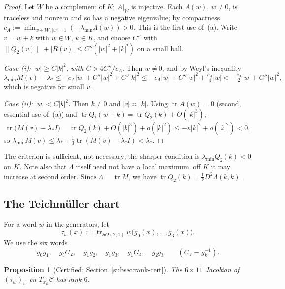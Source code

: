 \documentclass[11pt]{amsart}
\newtheorem{proposition}[theorem]{Proposition}
\theoremstyle{definition}
\theoremstyle{remark}
\newcommand{\Oct}{\mathcal{C}}
\newcommand{\tr}{\operatorname{tr}}
\newcommand{\ls}{\lambda_*}
\newcommand{\xB}{x_B}
\begin{document}
\begin{proof}
Let $W$ be a complement of $K$; $A|_W$ is injective. Each $A(w)$, $w\ne0$, is traceless and nonzero
and so has a negative eigenvalue; by compactness
$c_A:=\min_{w\in W,|w|=1}(-\lambda_{\min}A(w))>0$. This is the first use of~(a). Write $v=w+k$
with $w\in W$, $k\in K$, and choose $C''$ with $\|Q_2(v)\|+|R(v)|\le C''(|w|^2+|k|^2)$ on a small ball.

\emph{Case (i): $|w|\ge C|k|^2$, with $C>4C''/c_A$.} Then $w\ne0$, and by Weyl's inequality
\[
\lambda_{\min}M(v)-\ls\le-c_A|w|+C''|w|^2+C''|k|^2\le-c_A|w|+C''|w|^2+\tfrac{c_A}{4}|w|<-\tfrac{c_A}{2}|w|+C''|w|^2,
\]
which is negative for small $v$.

\emph{Case (ii): $|w|<C|k|^2$.} Then $k\ne0$ and $|v|\asymp|k|$. Using $\tr A(w)=0$ (second,
essential use of~(a)) and $\tr Q_2(w+k)=\tr Q_2(k)+O(|k|^3)$,
\[
\tr\big(M(v)-\ls I\big)=\tr Q_2(k)+O(|k|^3)+o(|k|^2)\le-\kappa|k|^2+o(|k|^2)<0,
\]
so $\lambda_{\min}M(v)\le\ls+\tfrac13\tr(M(v)-\ls I)<\ls$.
\end{proof}

The criterion is sufficient, not necessary; the sharper condition is
$\lambda_{\min}Q_2(k)<0$ on $K$. Note also that $\Lambda$ itself need not have a local maximum: off
$K$ it may increase at second order. Since $\Lambda=\tr M$, we have
$\tr Q_2(k)=\tfrac12D^2\Lambda(k,k)$.

\subsection{The Teichm\"uller chart}\label{subsec:chart}
For a word $w$ in the generators, let
\[
\tau_w(x):=\tr_{SO(2,1)}w\big(g_0(x),\dots,g_3(x)\big).
\]
We use the six words
\[
g_0g_1,\quad g_0G_2,\quad g_1g_2,\quad g_1g_3,\quad g_1G_3,\quad g_2g_3\qquad(G_k=g_k^{-1}).
\]

\begin{proposition}[Certified; Section~\ref{subsec:rank-cert}]\label{prop:G3}
The $6\times11$ Jacobian of $(\tau_w)_w$ on $T_{\xB}\Oct$ has rank $6$.
\end{proposition}
\end{document}
